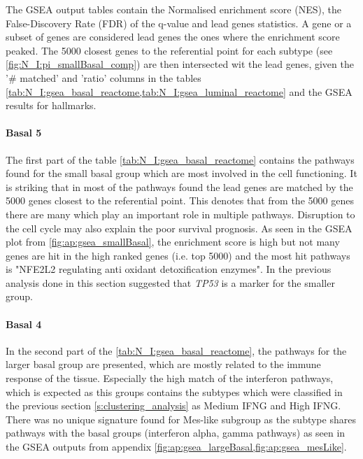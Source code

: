 The GSEA output tables contain the Normalised enrichment score (NES), the False-Discovery Rate (FDR) of the q-value and lead genes statistics. A gene or a subset of genes are considered lead genes the ones where the enrichment score peaked. The 5000 closest genes to the referential point for each subtype (see \cref{fig:N_I:pi_smallBasal_comp}) are then intersected wit the lead genes, given the '\# matched' and 'ratio' columns in the tables \cref{tab:N_I:gsea_basal_reactome,tab:N_I:gsea_luminal_reactome} and the GSEA results for hallmarks.


\paragraph*{Basal 5}

The first part of the table \cref{tab:N_I:gsea_basal_reactome} contains the pathways found for the small basal group which are most involved in the cell functioning. It is striking that in most of the pathways found the lead genes are matched by the 5000 genes closest to the referential point. This denotes that from the 5000 genes there are many which play an important role in multiple pathways. Disruption to the cell cycle may also explain the poor survival prognosis. As seen in the GSEA plot from \cref{fig:ap:gsea_smallBasal}, the enrichment score is high but not many genes are hit in the high ranked genes (i.e. top 5000) and the most hit pathways is "NFE2L2 regulating anti oxidant detoxification enzymes". In the previous analysis done in this section suggested that \textit{TP53} is a marker for the smaller group. 

\paragraph*{Basal 4}

In the second part of the \cref{tab:N_I:gsea_basal_reactome}, the pathways for the larger basal group are presented, which are mostly related to the immune response of the tissue. Especially the high match of the interferon pathways, which is expected as this groups contains the subtypes which were classified in the previous section \cref{s:clustering_analysis} as Medium IFNG and High IFNG. There was no unique signature found for Mes-like subgroup as the subtype shares pathways with the basal groups (interferon alpha, gamma pathways) as seen in the GSEA outputs from appendix \cref{fig:ap:gsea_largeBasal,fig:ap:gsea_mesLike}.

